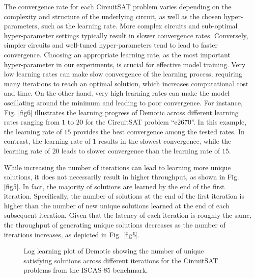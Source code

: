 The convergence rate for each CircuitSAT problem varies depending on the complexity and structure of the underlying circuit, as well as the chosen hyper-parameters, such as the learning rate. More complex circuits and sub-optimal hyper-parameter settings typically result in slower convergence rates. Conversely, simpler circuits and well-tuned hyper-parameters tend to lead to faster convergence. Choosing an appropriate learning rate, as the most important hyper-parameter in our experiments, is crucial for effective model training. Very low learning rates can make slow convergence of the learning process, requiring many iterations to reach an optimal solution, which increases computational cost and time. On the other hand, very high learning rates can make the model oscillating around the minimum and leading to poor convergence. For instance, Fig. \ref{fig6} illustrates the learning progress of {\sc Demotic} across different learning rates ranging from $1$ to $20$ for the CircuitSAT problem ``c$2670$''. In this example, the learning rate of $15$ provides the best convergence among the tested rates. In contrast, the learning rate of $1$ results in the slowest convergence, while the learning rate of $20$ leads to slower convergence than the learning rate of $15$.





While increasing the number of iterations can lead to learning more unique solutions, it does not necessarily result in higher throughput, as shown in Fig. \ref{fig5}. In fact, the majority of solutions are learned by the end of the first iteration. Specifically, the number of solutions at the end of the first iteration is higher than the number of new unique solutions learned at the end of each subsequent iteration. Given that the latency of each iteration is roughly the same, the throughput of generating unique solutions decreases as the number of iterations increases, as depicted in Fig. \ref{fig5}.

\begin{figure}[t]
    \centering
    \vspace{-0.75cm}
    
    \vspace{-1cm}
    \caption{Log learning plot of {\sc Demotic} showing the number of unique satisfying solutions across different iterations for the CircuitSAT problems from the ISCAS-85 benchmark.}
    \label{fig4}
    \vspace{-0.25cm}
\end{figure}

